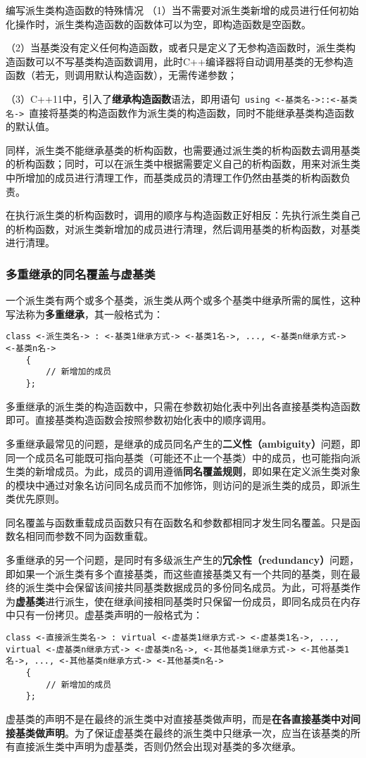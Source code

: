 \documentclass[10pt, a4paper, oneside, fontset=none]{ctexart}
\theoremstyle{plain}
\theoremstyle{definition}
\newcommand{\zhu}[2][]{\begin{note}{#1}\xiu #2\end{note}}
\newcommand{\tboba}[1]{\textbf{\kai\color{bali!75!black}#1}}
\begin{document}
\zhu[编写派生类构造函数的特殊情况]{
	（1）当不需要对派生类新增的成员进行任何初始化操作时，派生类构造函数的函数体可以为空，即构造函数是空函数。

	（2）当基类没有定义任何构造函数，或者只是定义了无参构造函数时，派生类构造函数可以不写基类构造函数调用，此时C++编译器将自动调用基类的无参构造函数（若无，则调用默认构造函数），无需传递参数；

	（3）C++11中，引入了\textbf{继承构造函数}语法，即用语句~\lstinline[style=notec]|using <-基类名->::<-基类名->|~直接将基类的构造函数作为派生类的构造函数，同时不能继承基类构造函数的默认值。
}

同样，派生类不能继承基类的析构函数，也需要通过派生类的析构函数去调用基类的析构函数；同时，可以在派生类中根据需要定义自己的析构函数，用来对派生类中所增加的成员进行清理工作，而基类成员的清理工作仍然由基类的析构函数负责。

在执行派生类的析构函数时，调用的顺序与构造函数正好相反：先执行派生类自己的析构函数，对派生类新增加的成员进行清理，然后调用基类的析构函数，对基类进行清理。

\subsubsection{多重继承的同名覆盖与虚基类}

一个派生类有两个或多个基类，派生类从两个或多个基类中继承所需的属性，这种写法称为\tboba{多重继承}，其一般格式为：
\begin{lstlisting}[style=intro]
	class <-派生类名-> : <-基类1继承方式-> <-基类1名->, ..., <-基类n继承方式-> <-基类n名->
	{
		// 新增加的成员
	};
\end{lstlisting}
多重继承的派生类的构造函数中，只需在参数初始化表中列出各直接基类构造函数即可。直接基类构造函数会按照参数初始化表中的顺序调用。

多重继承最常见的问题，是继承的成员同名产生的\textbf{二义性（ambiguity）}问题，即同一个成员名可能既可指向基类（可能还不止一个基类）中的成员，也可能指向派生类的新增成员。为此，成员的调用遵循\textbf{同名覆盖规则}，即如果在定义派生类对象的模块中通过对象名访问同名成员而不加修饰，则访问的是派生类的成员，即派生类优先原则。\label{同名覆盖规则}
\zhu[同名覆盖与函数重载]{成员函数只有在函数名和参数都相同才发生同名覆盖。只是函数名相同而参数不同为函数重载。}

多重继承的另一个问题，是同时有多级派生产生的\textbf{冗余性（redundancy）}问题，即如果一个派生类有多个直接基类，而这些直接基类又有一个共同的基类，则在最终的派生类中会保留该间接共同基类数据成员的多份同名成员。为此，可将基类作为\tboba{虚基类}进行派生，使在继承间接相同基类时只保留一份成员，即同名成员在内存中只有一份拷贝。虚基类声明的一般格式为：
\begin{lstlisting}[style=intro]
	class <-直接派生类名-> : virtual <-虚基类1继承方式-> <-虚基类1名->, ..., virtual <-虚基类n继承方式-> <-虚基类n名->, <-其他基类1继承方式-> <-其他基类1名->, ..., <-其他基类n继承方式-> <-其他基类n名->
	{
		// 新增加的成员
	};
\end{lstlisting}
虚基类的声明不是在最终的派生类中对直接基类做声明，而是\textbf{在各直接基类中对间接基类做声明}。为了保证虚基类在最终的派生类中只继承一次，应当在该基类的所有直接派生类中声明为虚基类，否则仍然会出现对基类的多次继承。
\end{document}
